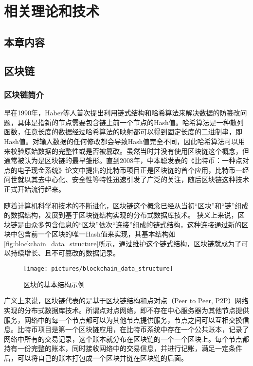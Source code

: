 \chapter{相关理论和技术}
\section{本章内容}

\section{区块链}
\subsection{区块链简介}
早在1990年，Haber等人首次提出利用链式结构和哈希算法来解决数据的防篡改问题\cite{haber1991time}，具体是指新的节点需要包含链上前一个节点的Hash值。哈希算法是一种散列函数，任意长度的数据经过哈希算法的映射都可以得到固定长度的二进制串，即Hash值。对输入数据的任何修改都会导致Hash值完全不同，因此哈希算法可以用来校验原始数据的完整性或是否被篡改。虽然当时并没有使用区块链这个概念，但通常被认为是区块链的最早雏形。直到2008年，中本聪发表的《比特币：一种点对点的电子现金系统》论文\cite{nakamoto2008bitcoin}中提出的比特币项目正是区块链的首个应用，比特币一经问世就以其去中心化、安全性等特性迅速引发了广泛的关注，随后区块链这种技术正式开始流行起来。

随着计算机科学和技术的不断进化，区块链这个概念已经从当初“区块”和“链”组成的数据结构，发展到基于区块链结构实现的分布式数据库技术。
狭义上来说，区块链是由众多包含信息的“区块”依次“连接”组成的链式结构，这种连接通过新的区块中包含前一个区块的唯一Hash值来实现，其基本结构如\autoref{fig:blockchain_data_structure}所示，通过维护这个链式结构，区块链就成为了可以持续增长、且不可篡改的数据记录。
\begin{figure}[htbp]
    \centering
    \texttt{[image: pictures/blockchain\_data\_structure]}
    \caption{\label{fig:blockchain_data_structure}区块的基本结构示例}
\end{figure}
广义上来说，区块链代表的是基于区块链结构和点对点（Peer to Peer, P2P）网络实现的分布式数据库技术。所谓点对点网络，即不存在中心服务器为其他节点提供服务，网络中的每一个节点都可以为其他节点提供服务，节点之间可以互相交换信息。比特币项目是第一个区块链应用，在比特币系统中存在一个公共账本，记录了网络中所有的交易记录，这个账本就分布在区块链的一个一个区块上。每个节点都持有一份完整的账本，同时接收网络中的交易信息，并进行记账，满足一定条件后，可以将自己的账本打包成一个区块并链在区块链的后面。

